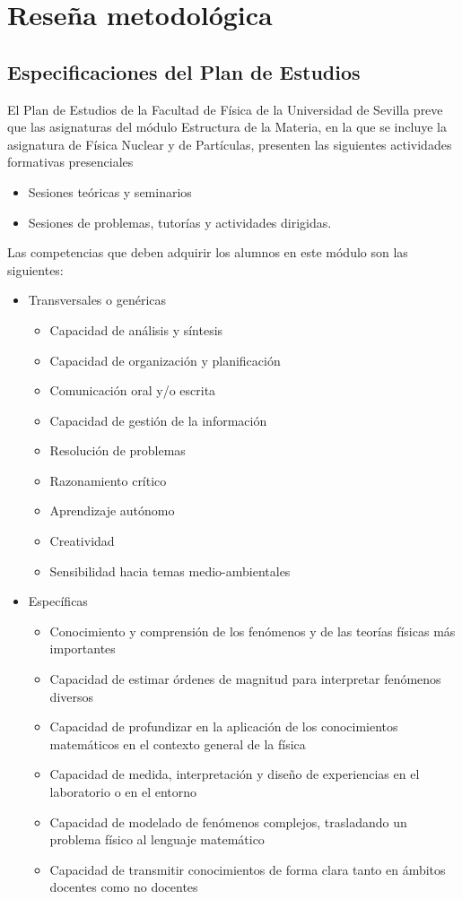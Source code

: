 \documentclass[a4paper,12pt,twoside]{article}
\begin{document}
\section{Reseña metodológica}

\subsection{Especificaciones del Plan de Estudios}

El Plan de Estudios de la Facultad de Física  de la Universidad de Sevilla \cite{planest} preve que las asignaturas del módulo Estructura de la Materia, en la que se incluye la asignatura de Física Nuclear y de Partículas, presenten las siguientes actividades formativas presenciales

\begin{itemize}
\item Sesiones teóricas y seminarios
\item Sesiones de problemas, tutorías y actividades dirigidas.
\end{itemize}

 Las competencias que deben adquirir los alumnos en este módulo son las siguientes:

\begin{itemize}
\item Transversales o genéricas
\begin{itemize}
\item Capacidad de análisis y síntesis
\item Capacidad de organización y planificación
\item Comunicación oral y/o escrita
\item Capacidad de gestión de la información
\item Resolución de problemas
\item Razonamiento crítico
\item Aprendizaje autónomo
\item Creatividad
\item Sensibilidad hacia temas medio-ambientales
\end{itemize}
\item Específicas
\begin{itemize}
\item Conocimiento y comprensión de los fenómenos y de las teorías físicas más importantes
\item Capacidad de estimar órdenes de magnitud para interpretar fenómenos diversos
\item Capacidad de profundizar en la aplicación de los conocimientos matemáticos en el contexto general de la física
\item Capacidad de medida, interpretación y diseño de experiencias en el laboratorio o en el entorno
\item Capacidad de modelado de fenómenos complejos, trasladando un problema físico al lenguaje matemático
\item Capacidad de transmitir conocimientos de forma clara tanto en ámbitos docentes como no docentes
\end{itemize}
\end{itemize}
\end{document}
